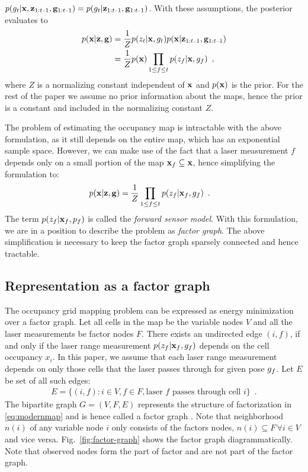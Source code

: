 \documentclass[letterpaper, 10 pt, conference]{ieeeconf} %
\begin{document}
$p(g_t|\map, \remaining) = p(g_t|\remaining)$. With these assumptions,
the posterior evaluates \cite{merali2013icra} to
\begin{align}
 p(\map | \measurements, \poses) &= \frac{1}{Z} p(z_t|\map , g_t)p(\map| \remaining)\\
                               &= \frac{1}{Z} p(\map)\prod_{1 \le f \le t}
 p(z_f|\map, g_f)\enspace,
 \label{eq:map}
\end{align}
where $Z$ is a normalizing constant independent of $\mathbf{x}$ and $p(\mathbf{x})$ is
the prior. For the rest of the paper we assume no prior information about
the maps, hence the prior is a constant and included in the normalizing
constant $Z$. 

The problem of estimating the occupancy map is intractable with the above
formulation, as it still depends on the entire map, which has an exponential
sample space. However, we can make use of the fact that
a laser measurement $f$ depends only on a small portion of the map $\mathbf{x}_f
\subseteq \mathbf{x}$, hence simplifying the formulation to:
\begin{align}
 p(\mathbf{x} | \mathbf{z}, \mathbf{g}) &= \frac{1}{Z} \prod_{1 \le f \le t}
 p(z_f|\mathbf{x}_f, g_f)\enspace.
 \label{eq:modernmap}
\end{align}
The term $p(z_f|\mathbf{x}_f, p_f)$ is called the \emph{forward sensor model}.
With this formulation, we are in a position to describe the problem as
\emph{factor graph}. The above simplification is necessary to keep the factor
graph sparsely connected and hence tractable.

\subsection{Representation as a factor graph}
\label{sec:notation}
The occupancy grid mapping problem can be expressed as energy minimization
over a factor graph. Let all cells in the map be the variable nodes $V$ and all
the laser measurements be factor nodes $F$. 
There exists an undirected edge $(i, f)$, if and only if the laser
range measurement $p(z_f|\mathbf{x}_f, g_f)$ depends on the cell occupancy 
$x_i$. In this paper, we assume that each laser range measurement depends on only
those cells that the laser passes through for given pose $g_f$. 
Let $E$ be set of all such edges:
\begin{align}
  E = \{(i, f) : i \in V, f \in F, \text{laser $f$ passes through cell $i$}\}
  \enspace.
\end{align}
The bipartite graph $G = (V, F, E)$ 
represents the structure of factorization in \eqref{eq:modernmap} and is hence
called a factor graph \cite{kschischang2001factor}.  
Note that neighborhood $n(i)$ of any variable node $i$ only consists of
the factors nodes, $n(i)\subseteq F \, \forall i \in V$ and vice versa.
Fig.~\ref{fig:factor-graph} shows the factor
graph diagrammatically. Note that observed nodes form the part of factor and
are not part of the factor graph.
\end{document}
